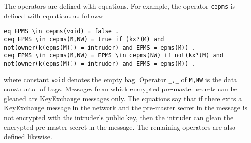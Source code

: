 \documentclass[a4paper,fleqn]{cas-dc}
\begin{document}

The operators are defined with equations. For example, the operator \verb!cepms! is defined with equations as follows:
\begin{small}
\begin{verbatim}
eq EPMS \in cepms(void) = false .
ceq EPMS \in cepms(M,NW) = true if (kx?(M) and 
not(owner(k(epms(M))) = intruder) and EPMS = epms(M)) .
ceq EPMS \in cepms(M,NW) = EPMS \in cepms(NW) if not(kx?(M) and
not(owner(k(epms(M))) = intruder) and EPMS = epms(M)) .
\end{verbatim}
\end{small}	
where constant \verb!void! denotes the empty bag. Operator    \verb|_,_| of \verb!M,NW! is the data constructor of bags. Messages from which encrypted pre-master secrets can be gleaned are KeyExchange messages only. The equations say that if there exits a KeyExchange message in the network and the pre-master secret in the message is not
encrypted with the intruder’s public key, then the intruder can glean the encrypted pre-master secret in the message.
The remaining operators are also defined likewise.
\end{document}
